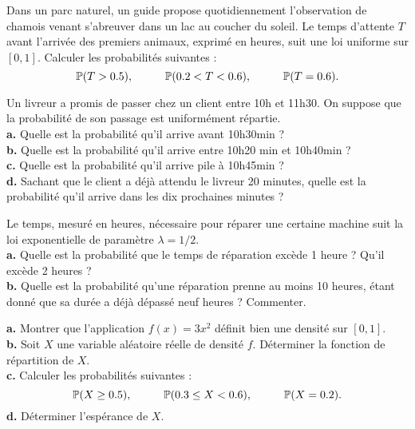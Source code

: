 





\begin{exo} Dans un parc naturel, un guide propose quotidiennement l'observation de chamois venant s'abreuver dans un lac au coucher du soleil. Le temps d'attente $T$ avant l'arrivée des premiers animaux, exprimé en heures, suit une loi uniforme sur $[0,1]$. Calculer les probabilités suivantes :
$$\P(T>0.5), \hspace{1cm} \P(0.2<T<0.6), \hspace{1cm} \P(T=0.6).$$
\end{exo}

\begin{exo} Un livreur a promis de passer chez un client entre 10h et 11h30. On suppose que la probabilité de son passage est uniformément répartie.\\
\noindent\textbf{a.} Quelle est la probabilité qu'il arrive avant 10h30min ?\\
\noindent\textbf{b.} Quelle est la probabilité qu'il arrive entre 10h20 min et 10h40min ?\\
\noindent\textbf{c.} Quelle est la probabilité qu'il arrive pile à 10h45min ?\\
\noindent\textbf{d.} Sachant que le client a déjà attendu le livreur 20 minutes, quelle est la probabilité qu'il arrive dans les dix prochaines minutes ?
\end{exo}

\bigskip

\begin{exo}
Le temps, mesuré en heures, nécessaire pour réparer une certaine machine suit la loi exponentielle de param\`etre $\lambda=1/2$.\\
\noindent\textbf{a.} Quelle est la probabilité que le temps de réparation excède 1 heure ? Qu'il excède 2 heures ?\\
\textbf{b.} Quelle est la probabilité qu'une réparation prenne au moins 10 heures, étant donné que sa durée a déjà dépassé neuf heures ? Commenter.
\end{exo}

\bigskip

\begin{exo}

\noindent\textbf{a.} Montrer que l'application $f(x)=3x^2$ définit bien une densité sur $[0,1]$.\\
\noindent\textbf{b.} Soit $X$ une variable aléatoire réelle de densité $f$. Déterminer la fonction de répartition de $X$.\\
\noindent\textbf{c.} Calculer les probabilités suivantes :
$$\P(X\geq 0.5), \hspace{1cm} \P(0.3\leq X<0.6), \hspace{1cm} \P(X=0.2).$$
\noindent\textbf{d.} Déterminer l'espérance de $X$.
\end{exo}

